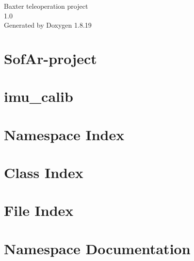 \let\mypdfximage\pdfximage\def\pdfximage{\immediate\mypdfximage}\documentclass[twoside]{book}
\newcommand{\+}{\discretionary{\mbox{\scriptsize$\hookleftarrow$}}{}{}}
\newcommand{\clearemptydoublepage}{%
  \newpage{\pagestyle{empty}\cleardoublepage}%
}
\begin{document}
\hypersetup{pageanchor=false,
             bookmarksnumbered=true,
             pdfencoding=unicode
            }
\begin{titlepage}
\vspace*{7cm}
\begin{center}%
{\Large Baxter teleoperation project \\[1ex]\large 1.\+0 }\\
\vspace*{1cm}
{\large Generated by Doxygen 1.8.19}\\
\end{center}
\end{titlepage}
\clearemptydoublepage
{}
\tableofcontents
\clearemptydoublepage
{}
\hypersetup{pageanchor=true}

\chapter{Sof\+Ar-\/project}
\label{index}\hypertarget{index}{}
\chapter{imu\+\_\+calib}
\label{md_Smartphone_compensation_README}

\chapter{Namespace Index}

\chapter{Class Index}

\chapter{File Index}

\chapter{Namespace Documentation}





















\end{document}
